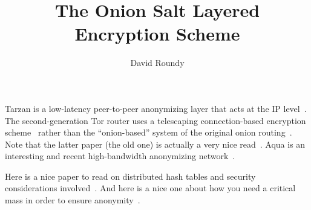 \documentclass[letterpaper,twocolumn,amsmath,amssymb,pre,aps,10pt]{revtex4-1}
\begin{document}
\title{The Onion Salt Layered Encryption Scheme}
\author{David Roundy}

\maketitle

Tarzan is a low-latency peer-to-peer anonymizing layer that acts at
the IP level~\cite{freedman2002tarzan}.  The second-generation Tor
router uses a telescaping connection-based encryption
scheme~\cite{dingledine2004tor} rather than the ``onion-based'' system
of the original onion routing~\cite{reed1998onionrouting}.  Note that
the latter paper (the old one) is actually a very nice
read~\cite{reed1998onionrouting}.  Aqua is an interesting and recent
high-bandwidth anonymizing network~\cite{leblond2013towards}.

Here is a nice paper to read on distributed hash tables and security
considerations involved~\cite{sit2002security}.  And here is a nice
one about how you need a critical mass in order to ensure
anonymity~\cite{dingledine2006anonymity}.

\end{document}
